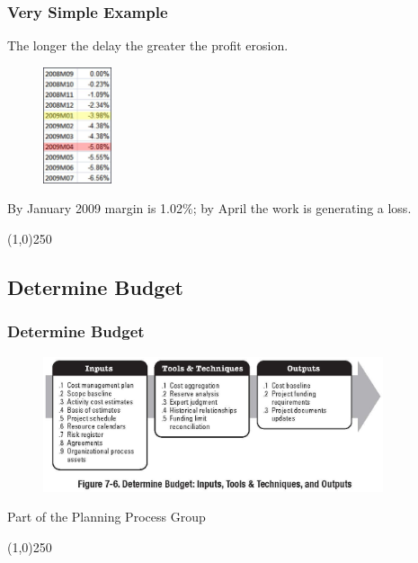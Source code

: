\begin{frame}
\frametitle{Very Simple Example}
The longer the delay the greater the profit erosion.\\
\begin{figure}
	\centering
		\includegraphics[width = 2cm]{images/proferos.jpg}
	\label{fig:proferos}
\end{figure}
By January 2009 margin is 1.02\%; by April the work is generating a loss.
\end{frame}
\begin{center}\line(1,0){250}\end{center}



\subsection{Determine Budget}


\begin{frame}
\frametitle{Determine Budget}
\begin{figure}
	\centering
		\includegraphics[width = 10cm]{images/Fig7-6.jpg}
	\label{fig:7-6c}
\end{figure}Part of the Planning Process Group
\end{frame}
\begin{center}\line(1,0){250}\end{center}






